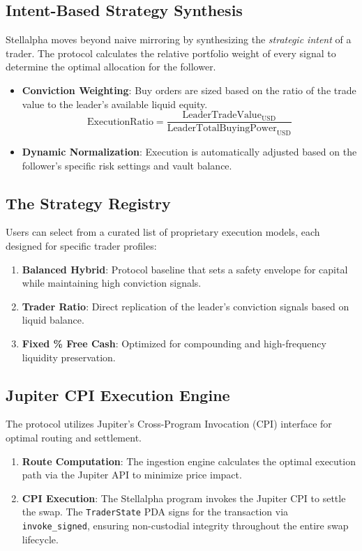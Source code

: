 \subsection{Intent-Based Strategy Synthesis}

Stellalpha moves beyond naive mirroring by synthesizing the \textit{strategic intent} of a trader. The protocol calculates the relative portfolio weight of every signal to determine the optimal allocation for the follower.

\begin{itemize}
  \item \textbf{Conviction Weighting}: Buy orders are sized based on the ratio of the trade value to the leader's available liquid equity.
  \[
  \text{ExecutionRatio} = \frac{\text{LeaderTradeValue}_{\text{USD}}}{\text{LeaderTotalBuyingPower}_{\text{USD}}}
  \]
  \item \textbf{Dynamic Normalization}: Execution is automatically adjusted based on the follower's specific risk settings and vault balance.
\end{itemize}

\subsection{The Strategy Registry}

Users can select from a curated list of proprietary execution models, each designed for specific trader profiles:
\begin{enumerate}
  \item \textbf{Balanced Hybrid}: Protocol baseline that sets a safety envelope for capital while maintaining high conviction signals.
  \item \textbf{Trader Ratio}: Direct replication of the leader's conviction signals based on liquid balance.
  \item \textbf{Fixed \% Free Cash}: Optimized for compounding and high-frequency liquidity preservation.
\end{enumerate}

\subsection{Jupiter CPI Execution Engine}

The protocol utilizes Jupiter's Cross-Program Invocation (CPI) interface for optimal routing and settlement.

\begin{enumerate}
  \item \textbf{Route Computation}: The ingestion engine calculates the optimal execution path via the Jupiter API to minimize price impact.
  \item \textbf{CPI Execution}: The Stellalpha program invokes the Jupiter CPI to settle the swap. The \texttt{TraderState} PDA signs for the transaction via \texttt{invoke\_signed}, ensuring non-custodial integrity throughout the entire swap lifecycle.
\end{enumerate}
